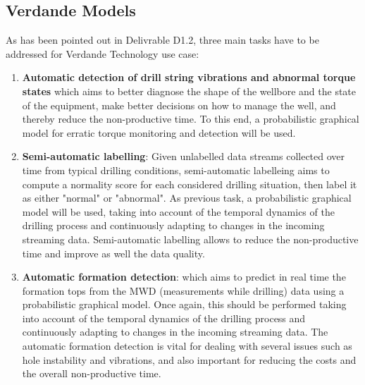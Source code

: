 \subsection{Verdande Models}
\label{Section:VerdandeModels}



As has been pointed out in Delivrable D1.2, three main tasks have to be addressed for Verdande Technology use case:

\begin{enumerate}

\item \textbf{Automatic detection of drill string vibrations and abnormal torque states} which aims to better diagnose the shape of the wellbore and the state of the equipment, make better decisions on how to manage the well, and thereby reduce the non-productive time. To this end, a probabilistic graphical model for erratic torque monitoring and detection will be used.


\item \textbf{Semi-automatic labelling}: Given unlabelled data streams collected over time from typical drilling conditions, semi-automatic labelleing aims to compute a normality score for each considered drilling situation, then label it as either "normal" or "abnormal". As previous task, a probabilistic graphical model will be used, taking into account of the temporal dynamics of the drilling process and continuously adapting to changes in the incoming streaming data. Semi-automatic labelling allows to reduce the non-productive time and improve as well the data quality.

\item \textbf{Automatic formation detection}: which aims to predict in real time the formation tops from the MWD (measurements while drilling) data using a probabilistic graphical model. Once again, this should be performed taking into account of the temporal dynamics of the drilling process and continuously adapting to changes in the incoming streaming data. The automatic formation detection is vital for dealing with several issues such as hole instability and vibrations, and also important for reducing the costs and the overall non-productive time.
\end{enumerate}

